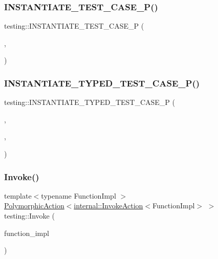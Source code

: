 \mbox{\label{namespacetesting_a5b049e97e9082df909e4a0f740ff5d02}} 
\subsubsection{\texorpdfstring{INSTANTIATE\_TEST\_CASE\_P()}{INSTANTIATE\_TEST\_CASE\_P()}}
{\footnotesize\ttfamily testing\+::\+I\+N\+S\+T\+A\+N\+T\+I\+A\+T\+E\+\_\+\+T\+E\+S\+T\+\_\+\+C\+A\+S\+E\+\_\+P (\begin{DoxyParamCaption}\item[{\mbox{\hyperlink{classtesting_1_1CodeLocationForTESTP}{Code\+Location\+For\+T\+E\+S\+TP}}}]{,  }\item[{\mbox{\hyperlink{namespacetesting_a8209ef59db08b8ad4beed30d8d6e6a88}{Values}}(0)}]{ }\end{DoxyParamCaption})}

\mbox{\label{namespacetesting_a111c1dea1140652727ab97ddc13eb045}} 
\subsubsection{\texorpdfstring{INSTANTIATE\_TYPED\_TEST\_CASE\_P()}{INSTANTIATE\_TYPED\_TEST\_CASE\_P()}}
{\footnotesize\ttfamily testing\+::\+I\+N\+S\+T\+A\+N\+T\+I\+A\+T\+E\+\_\+\+T\+Y\+P\+E\+D\+\_\+\+T\+E\+S\+T\+\_\+\+C\+A\+S\+E\+\_\+P (\begin{DoxyParamCaption}\item[{My}]{,  }\item[{\mbox{\hyperlink{classtesting_1_1CodeLocationForTYPEDTESTP}{Code\+Location\+For\+T\+Y\+P\+E\+D\+T\+E\+S\+TP}}}]{,  }\item[{int}]{ }\end{DoxyParamCaption})}

\mbox{\label{namespacetesting_a12aebaf8363d49a383047529f798b694}} 
\subsubsection{\texorpdfstring{Invoke()}{Invoke()}\hspace{0.1cm}{\footnotesize\ttfamily [1/2]}}
{\footnotesize\ttfamily template$<$typename Function\+Impl $>$ \\
\mbox{\hyperlink{classtesting_1_1PolymorphicAction}{Polymorphic\+Action}}$<$\mbox{\hyperlink{classtesting_1_1internal_1_1InvokeAction}{internal\+::\+Invoke\+Action}}$<$Function\+Impl$>$ $>$ testing\+::\+Invoke (\begin{DoxyParamCaption}\item[{Function\+Impl}]{function\+\_\+impl }\end{DoxyParamCaption})}

